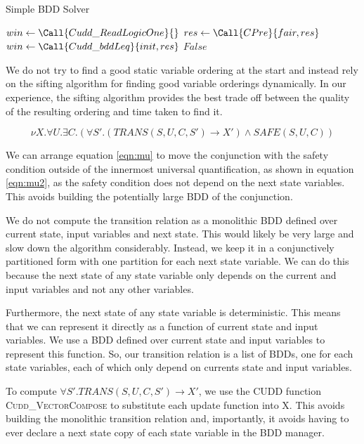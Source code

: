 \begin{algorithm}
\caption{Simple BDD Solver}
\label{alg:syntcomp}

\begin{algorithmic}

\State $win \gets \Call{Cudd\_ReadLogicOne}{}$
\Loop
    \State $res \gets \Call{CPre}{fair, res}$
    \State $win \gets \Call{Cudd\_bddLeq}{init, res}$
        \State \Return $False$
    \EndIf
\EndLoop

\end{algorithmic}
\end{algorithm}

We do not try to find a good static variable ordering at the start and instead rely on the sifting algorithm for finding good variable orderings dynamically. In our experience, the sifting algorithm provides the best trade off between the quality of the resulting ordering and time taken to find it. 

\begin{equation}
\label{eqn:mu2}
\nu X. \forall U. \exists C. (\forall S'. (TRANS(S, U, C, S') \rightarrow X') \wedge SAFE(S, U, C))
\end{equation}

We can arrange equation \ref{eqn:mu} to move the conjunction with the safety condition outside of the innermost universal quantification, as shown in equation \ref{eqn:mu2}, as the safety condition does not depend on the next state variables. This avoids building the potentially large BDD of the conjunction.

We do not compute the transition relation as a monolithic BDD defined over current state, input variables and next state. This would likely be very large and slow down the algorithm considerably. Instead, we keep it in a conjunctively partitioned form with one partition for each next state variable. We can do this because the next state of any state variable only depends on the current and input variables and not any other variables. 

Furthermore, the next state of any state variable is deterministic. This means that we can represent it directly as a function of current state and input variables. We use a BDD defined over current state and input variables to represent this function. So, our transition relation is a list of BDDs, one for each state variables, each of which only depend on currents state and input variables. 

To compute $\forall S'. TRANS(S, U, C, S') \rightarrow X'$, we use the CUDD function \textsc{Cudd\_VectorCompose} to substitute each update function into X. This avoids building the monolithic transition relation and, importantly, it avoids having to ever declare a next state copy of each state variable in the BDD manager. 


